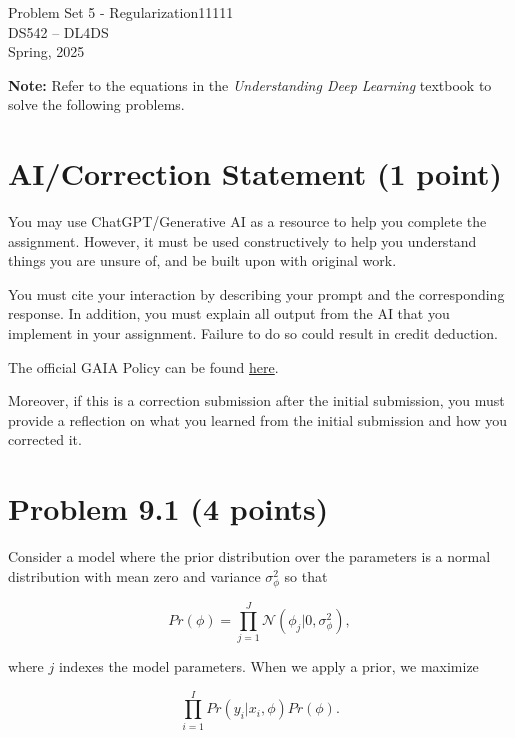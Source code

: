 \documentclass[10pt]{article}
\begin{document}
\begin{center}
    \LARGE {Problem Set 5 - Regularization11111} \\[1em]
    \Large{DS542 – DL4DS} \\[0.5em]
    \large Spring, 2025
\end{center}

\vspace{2em}

\noindent\textbf{Note:} Refer to the equations in the \textit{Understanding Deep Learning} 
textbook to solve the following problems.

\section*{AI/Correction Statement (1 point)}

You may use ChatGPT/Generative AI as a resource to help you complete the assignment. 
However, it must be used constructively to help you understand things you are 
unsure of, and be built upon with original work.

You must cite your interaction by describing your prompt and the corresponding response. 
In addition, you must  explain all output from the AI that you implement in your 
assignment. Failure to do so could result in credit deduction. 

The official GAIA Policy can be found 
\href{https://www.bu.edu/cds-faculty/culture-community/gaia-policy/}{here}.

Moreover, if this is a correction submission after the initial submission, 
you must provide a reflection on what you learned from the initial submission 
and how you corrected it.

\vspace{3em}

\section*{Problem 9.1 (4 points)}
Consider a model where the prior distribution over the parameters is a normal distribution with mean zero and variance
$\sigma^2_{\phi}$ so that

\begin{equation}
    Pr(\phi) = \prod_{j=1}^{J} \mathcal{N}(\phi_j | 0, \sigma^2_{\phi}),
\end{equation}

\noindent where $j$ indexes the model parameters. When we apply a prior, we maximize

\begin{equation}
    \prod_{i=1}^{I} Pr(y_i | x_i, \phi) Pr(\phi).
\end{equation}
\end{document}

